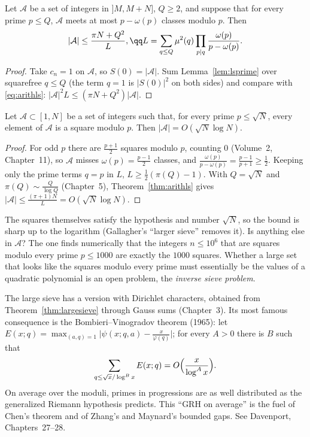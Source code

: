 \begin{theorem}\label{thm:arithls}
Let $\mathcal A$ be a set of integers in $]M,M+N]$, $Q\ge2$, and suppose that for every prime $p\le Q$, $\mathcal A$ meets at most $p-\omega(p)$ classes modulo $p$. Then
\[
\begin{gathered}|\mathcal A|\le\frac{\pi N+Q^2}L,\qq L=\sum_{q\le Q}\mu^2(q)\prod_{p\mid q}\frac{\omega(p)}{p-\omega(p)}.\end{gathered}
\]
\end{theorem}
\begin{proof}
Take $c_n=1$ on $\mathcal A$, so $S(0)=|\mathcal A|$. Sum Lemma~\ref{lem:lsprime} over squarefree $q\le Q$ (the term $q=1$ is $|S(0)|^2$ on both sides) and compare with \eqref{eq:arithls}: $|\mathcal A|^2L\le(\pi N+Q^2)|\mathcal A|$.
\end{proof}

\begin{proposition}\label{prop:squares}
Let $\mathcal A\subset[1,N]$ be a set of integers such that, for every prime $p\le\sqrt N$, every element of $\mathcal A$ is a square modulo $p$. Then $|\mathcal A|=O(\sqrt N\log N)$.
\end{proposition}
\begin{proof}
For odd $p$ there are $\frac{p+1}2$ squares modulo $p$, counting $0$ (Volume~2, Chapter~11), so $\mathcal A$ misses $\omega(p)=\frac{p-1}2$ classes, and $\frac{\omega(p)}{p-\omega(p)}=\frac{p-1}{p+1}\ge\frac12$. Keeping only the prime terms $q=p$ in $L$,
$L\ge\frac12(\pi(Q)-1)$. With $Q=\sqrt N$ and $\pi(Q)\sim\frac Q{\log Q}$ (Chapter~5), Theorem~\ref{thm:arithls} gives $|\mathcal A|\le\frac{(\pi+1)N}{L}=O(\sqrt N\log N)$.
\end{proof}

The squares themselves satisfy the hypothesis and number $\sqrt N$, so the bound is sharp up to the logarithm (Gallagher's ``larger sieve'' removes it). Is anything else in $\mathcal A$? The
one finds numerically that the integers $n\le10^6$ that are squares modulo every prime $p\le1000$ are exactly the $1000$ squares. Whether a large set that looks like the squares modulo
every prime must essentially be the values of a quadratic polynomial is an open problem, the \emph{inverse sieve problem}.

\begin{remark}\label{rem:bv}
The large sieve has a version with Dirichlet characters, obtained from Theorem~\ref{thm:largesieve} through Gauss sums (Chapter~3). Its most famous consequence is the Bombieri--Vinogradov theorem (1965):
let $E(x;q)=\max_{(a,q)=1}\bigl|\psi(x;q,a)-\frac x{\varphi(q)}\bigr|$; for every $A>0$ there is $B$ such that
\[
\sum_{q\le\sqrt x/\log^Bx}E(x;q)=O\Bigl(\frac x{\log^Ax}\Bigr).
\]
On average over the moduli, primes in progressions are as well distributed as the generalized Riemann hypothesis predicts. This ``GRH on average'' is the fuel of Chen's theorem and of Zhang's
and Maynard's bounded gaps. See Davenport, Chapters~27--28.
\end{remark}

